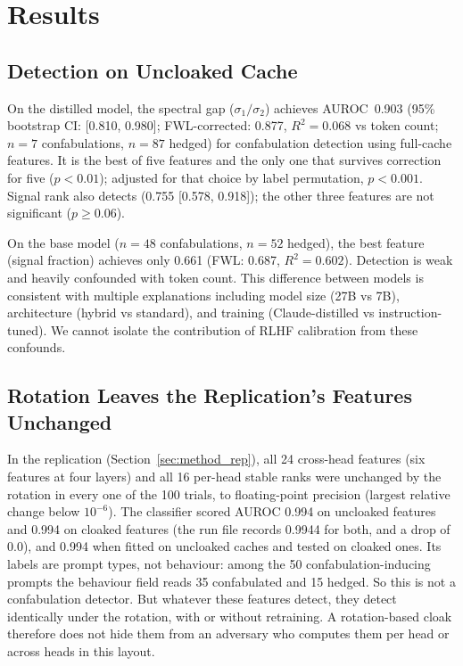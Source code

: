 \section{Results}

\subsection{Detection on Uncloaked Cache}

On the distilled model, the spectral gap ($\sigma_1/\sigma_2$) achieves
AUROC~0.903 (95\% bootstrap CI: [0.810, 0.980]; FWL-corrected: 0.877,
$R^2 = 0.068$ vs token count; $n=7$ confabulations, $n=87$ hedged)
for confabulation detection using full-cache features. It is the best of
five features and the only one that survives correction for five
($p < 0.01$); adjusted for that choice by label permutation, $p < 0.001$.
Signal rank also detects (0.755 [0.578, 0.918]); the other three features
are not significant ($p \geq 0.06$).

On the base model ($n=48$ confabulations, $n=52$ hedged), the best
feature (signal fraction) achieves only 0.661 (FWL: 0.687,
$R^2 = 0.602$). Detection is weak and heavily confounded with token
count. This difference between models is consistent with multiple
explanations including model size (27B vs 7B), architecture
(hybrid vs standard), and training (Claude-distilled vs
instruction-tuned). We cannot isolate the contribution of RLHF
calibration from these confounds.

\subsection{Rotation Leaves the Replication's Features Unchanged}
\label{sec:replication}

In the replication (Section~\ref{sec:method_rep}), all 24 cross-head
features (six features at four layers) and all 16 per-head stable ranks
were unchanged by the rotation in every one of the 100 trials, to
floating-point precision (largest relative change below $10^{-6}$). The
classifier scored AUROC 0.994 on uncloaked features and 0.994 on cloaked
features (the run file records 0.9944 for both, and a drop of 0.0), and
0.994 when fitted on uncloaked caches and tested on cloaked ones. Its
labels are prompt types, not behaviour: among the 50
confabulation-inducing prompts the behaviour field reads 35 confabulated
and 15 hedged. So this is not a confabulation detector. But whatever
these features detect, they detect identically under the rotation, with
or without retraining. A rotation-based cloak therefore does not hide them
from an adversary who computes them per head or across heads in this
layout.


